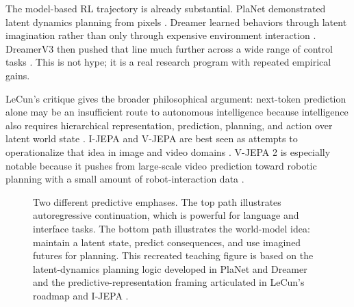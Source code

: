 \documentclass[12pt]{article}
\begin{document}
The model-based RL trajectory is already substantial. PlaNet demonstrated latent dynamics planning from pixels \cite{hafner2019planet}. Dreamer learned behaviors through latent imagination rather than only through expensive environment interaction \cite{hafner2020dreamer}. DreamerV3 then pushed that line much further across a wide range of control tasks \cite{hafner2025dreamerv3}. This is not hype; it is a real research program with repeated empirical gains.

LeCun's critique gives the broader philosophical argument: next-token prediction alone may be an insufficient route to autonomous intelligence because intelligence also requires hierarchical representation, prediction, planning, and action over latent world state \cite{lecun2022path}. I-JEPA and V-JEPA are best seen as attempts to operationalize that idea in image and video domains \cite{assran2023ijepa}. V-JEPA 2 is especially notable because it pushes from large-scale video prediction toward robotic planning with a small amount of robot-interaction data \cite{assran2025vjepa2}.

\begin{figure}[ht]
    \centering
    \caption{Two different predictive emphases. The top path illustrates autoregressive continuation, which is powerful for language and interface tasks. The bottom path illustrates the world-model idea: maintain a latent state, predict consequences, and use imagined futures for planning. This recreated teaching figure is based on the latent-dynamics planning logic developed in PlaNet and Dreamer and the predictive-representation framing articulated in LeCun's roadmap and I-JEPA \cite{hafner2019planet,hafner2020dreamer,lecun2022path,assran2023ijepa}.}
    \label{t18fig:prediction_modes}
\end{figure}
\end{document}
